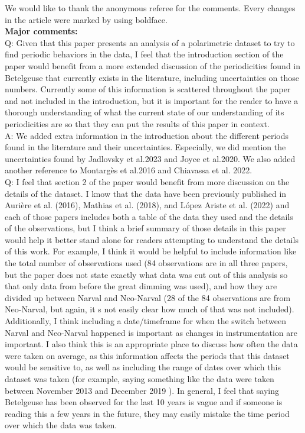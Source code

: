 \documentclass{article}
\begin{document}
We would like to thank the anonymous referee for the comments. Every changes in the article were marked by using boldface. \\

\textbf{Major comments:}\\

Q: Given that this paper presents an analysis of a polarimetric dataset to try to find periodic
behaviors in the data, I feel that the introduction section of the paper would benefit from a more
extended discussion of the periodicities found in Betelgeuse that currently exists in the
literature, including uncertainties on those numbers. Currently some of this information is
scattered throughout the paper and not included in the introduction, but it is important for the
reader to have a thorough understanding of what the current state of our understanding of its
periodicities are so that they can put the results of this paper in context.\\

A: We added extra information in the introduction about the different periods found in the literature and their uncertainties. Especially, we did mention the uncertainties found by Jadlovsky et al.2023 and Joyce et al.2020. We also added another reference to Montargès et al.2016 and Chiavassa et al. 2022.\\

Q: I feel that section 2 of the paper would benefit from more discussion on the details of the
dataset. I know that the data have been previously published in Aurière et al. (2016), Mathias et
al. (2018), and López Ariste et al. (2022) and each of those papers includes both a table of the
data they used and the details of the observations, but I think a brief summary of those details in
this paper would help it better stand alone for readers attempting to understand the details of
this work. For example, I think it would be helpful to include information like the total number of
observations used (84 observations are in all three papers, but the paper does not state exactly
what data was cut out of this analysis so that only data from before the great dimming was
used), and how they are divided up between Narval and Neo-Narval (28 of the 84 observations
are from Neo-Narval, but again, it s not easily clear how much of that was not included).
Additionally, I think including a date/timeframe for when the switch between Narval and
Neo-Narval happened is important as changes in instrumentation are important. I also think this
is an appropriate place to discuss how often the data were taken on average, as this information
affects the periods that this dataset would be sensitive to, as well as including the range of dates
over which this dataset was taken (for example, saying something like the data were taken
between November 2013 and December 2019 ). In general, I feel that saying Betelgeuse has
been observed for the last 10 years is vague and if someone is reading this a few years in the
future, they may easily mistake the time period over which the data was taken.\\
\end{document}
